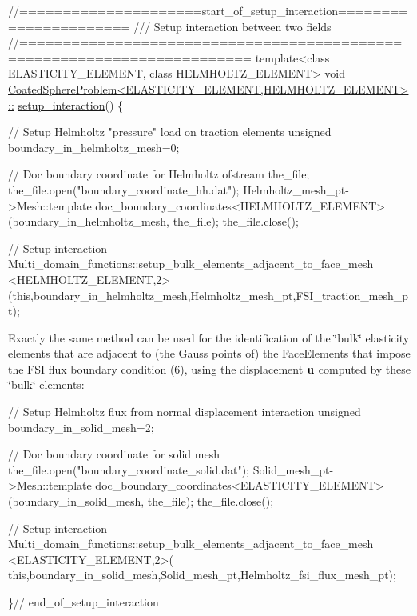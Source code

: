  
\begin{DoxyCodeInclude}
\textcolor{comment}{//=====================start\_of\_setup\_interaction======================}
\textcolor{comment}{/// Setup interaction between two fields}
\textcolor{comment}{}\textcolor{comment}{//========================================================================}
\textcolor{keyword}{template}<\textcolor{keyword}{class} ELASTICITY\_ELEMENT, \textcolor{keyword}{class} HELMHOLTZ\_ELEMENT>
\textcolor{keywordtype}{void} \hyperlink{classCoatedSphereProblem_aeea43c892871a6c65df992aedc3b3547}{CoatedSphereProblem<ELASTICITY\_ELEMENT,HELMHOLTZ\_ELEMENT>::}
\hyperlink{classCoatedSphereProblem_aeea43c892871a6c65df992aedc3b3547}{setup\_interaction}()
\{

 \textcolor{comment}{// Setup Helmholtz "pressure" load on traction elements}
 \textcolor{keywordtype}{unsigned} boundary\_in\_helmholtz\_mesh=0;

 \textcolor{comment}{// Doc boundary coordinate for Helmholtz}
 ofstream the\_file;
 the\_file.open(\textcolor{stringliteral}{"boundary\_coordinate\_hh.dat"});
 Helmholtz\_mesh\_pt->Mesh::template doc\_boundary\_coordinates<HELMHOLTZ\_ELEMENT>
  (boundary\_in\_helmholtz\_mesh, the\_file);
 the\_file.close();

 \textcolor{comment}{// Setup interaction}
  Multi\_domain\_functions::setup\_bulk\_elements\_adjacent\_to\_face\_mesh
  <HELMHOLTZ\_ELEMENT,2>
  (\textcolor{keyword}{this},boundary\_in\_helmholtz\_mesh,Helmholtz\_mesh\_pt,FSI\_traction\_mesh\_pt);

\end{DoxyCodeInclude}


Exactly the same method can be used for the identification of the \char`\"{}bulk\char`\"{} elasticity elements that are adjacent to (the Gauss points of) the {\ttfamily Face\+Elements} that impose the F\+SI flux boundary condition (6), using the displacement $ {\bf u} $ computed by these \char`\"{}bulk\char`\"{} elements\+:


\begin{DoxyCodeInclude}

 \textcolor{comment}{// Setup Helmholtz flux from normal displacement interaction}
 \textcolor{keywordtype}{unsigned} boundary\_in\_solid\_mesh=2;

 \textcolor{comment}{// Doc boundary coordinate for solid mesh}
 the\_file.open(\textcolor{stringliteral}{"boundary\_coordinate\_solid.dat"});
 Solid\_mesh\_pt->Mesh::template doc\_boundary\_coordinates<ELASTICITY\_ELEMENT>
  (boundary\_in\_solid\_mesh, the\_file);
 the\_file.close();

 \textcolor{comment}{// Setup interaction}
 Multi\_domain\_functions::setup\_bulk\_elements\_adjacent\_to\_face\_mesh
  <ELASTICITY\_ELEMENT,2>(
   \textcolor{keyword}{this},boundary\_in\_solid\_mesh,Solid\_mesh\_pt,Helmholtz\_fsi\_flux\_mesh\_pt);

\}\textcolor{comment}{// end\_of\_setup\_interaction}

\end{DoxyCodeInclude}




